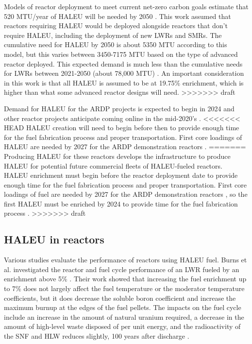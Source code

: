 Models of reactor deployment to meet current net-zero carbon goals 
estimate that 520 MTU/year of \gls{HALEU} will be needed by 2050 
\cite{dixon_estimated_2022}. This work assumed that reactors 
requiring \gls{HALEU} would be deployed alongside reactors that don't 
require \gls{HALEU}, including the deployment of new 
\glspl{LWR} and \glspl{SMR}. 
The cumulative need for \gls{HALEU} by 2050 
is about 5350 MTU according to this model, but this varies between 
3450-7175 MTU based on the type of advanced reactor deployed. 
This expected demand is much less than the 
cumulative needs for \glspl{LWR} between 2021-2050 (about 78,000 MTU) 
\cite{dixon_estimated_2022}. An important 
consideration in this work is that all \gls{HALEU} is assumed to be 
at 19.75\% enrichment, which is higher than what some advanced reactor 
designs will need. 
>>>>>>> draft

Demand for \gls{HALEU} for the \gls{ARDP} projects is expected to begin in 
2024 and other reactor projects anticipate coming online in the 
mid-2020's \cite{nuclear_energy_institute_establishing_2022}. 
<<<<<<< HEAD
\gls{HALEU} creation will need to begin before then to provide enough 
time for the fuel fabrication process and proper transportation. First 
core loadings of \gls{HALEU} are needed by 2027 for the \gls{ARDP} 
demonstration reactors \cite{dixon_estimated_2022}. 
=======
Producing \gls{HALEU} for these reactors develops the infrastructure 
to produce \gls{HALEU} for potential future commercial fleets of 
\gls{HALEU}-fueled reactors. 
\gls{HALEU} enrichment must begin before the reactor deployment 
date to provide enough 
time for the fuel fabrication process and proper transportation. First 
core loadings of fuel are needed by 2027 for the \gls{ARDP} 
demonstration reactors \cite{dixon_estimated_2022}, so the 
first \gls{HALEU} must be enriched by 2024 to provide 
time for the fuel fabrication process 
\cite{nuclear_energy_institute_establishing_2022}. 
>>>>>>> draft

\subsection{HALEU in reactors}
Various studies evaluate the performance of reactors 
using \gls{HALEU} fuel. Burns et al. investigated the reactor and fuel cycle 
performance of an \gls{LWR} fueled by an enrichment above 5\% \cite{burns_reactor_2020}.
Their work showed that increasing the fuel enrichment up to 7\% does not 
largely affect the fuel temperature or the moderator temperature coefficients,
but it does decrease the soluble boron coefficient and increase the maximum 
burnup at the edges of the fuel pellets. The impacts on the fuel cycle include 
an increase in the amount of natural uranium required, a decrease in the 
amount of high-level waste disposed of per unit energy, and the 
radioactivity of the \gls{SNF} and \gls{HLW} reduces slightly, 100 years 
after discharge \cite{burns_reactor_2020}.


